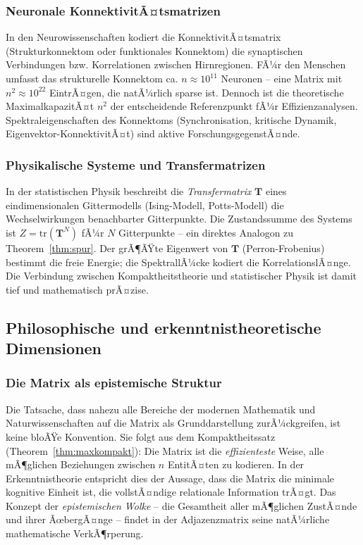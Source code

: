 ﻿\documentclass[12pt, a4paper]{article}
\theoremstyle{definition}
\theoremstyle{remark}
\newcommand{\vT}{\bm{T}}
\newcommand{\tr}{\mathrm{tr}}
\begin{document}
\subsubsection*{Neuronale KonnektivitÃ¤tsmatrizen}

In den Neurowissenschaften kodiert die KonnektivitÃ¤tsmatrix (Strukturkonnektom
oder funktionales Konnektom) die synaptischen Verbindungen bzw.
Korrelationen zwischen Hirnregionen. FÃ¼r den Menschen umfasst das
strukturelle Konnektom ca. $n \approx 10^{11}$ Neuronen -- eine Matrix
mit $n^2 \approx 10^{22}$ EintrÃ¤gen, die natÃ¼rlich sparse ist.
Dennoch ist die theoretische MaximalkapazitÃ¤t $n^2$ der entscheidende
Referenzpunkt fÃ¼r Effizienzanalysen. Spektraleigenschaften des
Konnektoms (Synchronisation, kritische Dynamik, Eigenvektor-KonnektivitÃ¤t)
sind aktive ForschungsgegenstÃ¤nde.

\subsubsection*{Physikalische Systeme und Transfermatrizen}

In der statistischen Physik beschreibt die \emph{Transfermatrix}
$\vT$ eines eindimensionalen Gittermodells (Ising-Modell, Potts-Modell)
die Wechselwirkungen benachbarter Gitterpunkte. Die Zustandssumme des
Systems ist $Z = \tr(\vT^N)$ fÃ¼r $N$ Gitterpunkte -- ein direktes
Analogon zu Theorem~\ref{thm:spur}. Der grÃ¶ÃŸte Eigenwert von $\vT$
(Perron-Frobenius) bestimmt die freie Energie; die SpektrallÃ¼cke
kodiert die KorrelationslÃ¤nge. Die Verbindung zwischen
Kompaktheitstheorie und statistischer Physik ist damit tief und
mathematisch prÃ¤zise.

\subsection{Philosophische und erkenntnistheoretische Dimensionen}
\label{subsec:philosophie}

\subsubsection*{Die Matrix als epistemische Struktur}

Die Tatsache, dass nahezu alle Bereiche der modernen Mathematik und
Naturwissenschaften auf die Matrix als Grunddarstellung zurÃ¼ckgreifen,
ist keine bloÃŸe Konvention. Sie folgt aus dem Kompaktheitssatz
(Theorem~\ref{thm:maxkompakt}): Die Matrix ist die \emph{effizienteste}
Weise, alle mÃ¶glichen Beziehungen zwischen $n$ EntitÃ¤ten zu kodieren.
In der Erkenntnistheorie entspricht dies der Aussage, dass die Matrix
die minimale kognitive Einheit ist, die vollstÃ¤ndige relationale
Information trÃ¤gt. Das Konzept der \emph{epistemischen Wolke}
\citep{epp2026sysstate} -- die Gesamtheit aller mÃ¶glichen ZustÃ¤nde
und ihrer ÃœbergÃ¤nge -- findet in der Adjazenzmatrix seine natÃ¼rliche
mathematische VerkÃ¶rperung.
\end{document}
